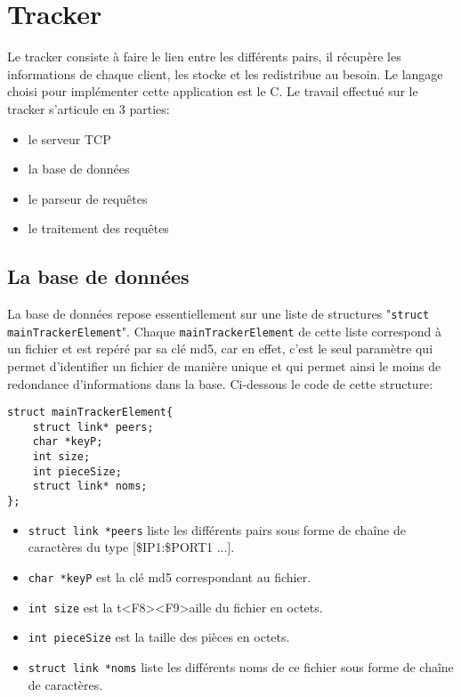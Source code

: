 \section{Tracker}
Le tracker consiste à faire le lien entre les différents pairs, il récupère les informations de chaque client, les stocke et les redistribue au besoin. Le langage choisi pour implémenter cette application est le C. Le travail effectué sur le tracker s'articule en 3 parties:

\begin{itemize}
\item le serveur TCP
\item la base de données
\item le parseur de requêtes
\item le traitement des requêtes
\end{itemize}

\subsection{La base de données}
La base de données repose essentiellement sur une liste de structures "\texttt{struct mainTrackerElement}". Chaque \texttt{mainTrackerElement} de cette liste correspond à un fichier et est repéré par sa clé md5, car en effet, c'est le seul paramètre qui permet d'identifier un fichier de manière unique et qui permet ainsi le moins de redondance d'informations dans la base. Ci-dessous le code de cette structure:

\begin{verbatim}
struct mainTrackerElement{
	struct link* peers;
	char *keyP;
	int size;
	int pieceSize;
	struct link* noms;
};
\end{verbatim}

\begin{itemize}
\item \texttt{struct link *peers} liste les différents pairs sous forme de chaîne de caractères du type [\$IP1:\$PORT1 ...].
\item \texttt{char *keyP} est la clé md5 correspondant au fichier.
\item \texttt{int size} est la t<F8><F9>aille du fichier en octets.
\item \texttt{int pieceSize} est la taille des pièces en octets.
\item \texttt{struct link *noms} liste les différents noms de ce fichier sous forme de chaîne de caractères.
\end{itemize}

